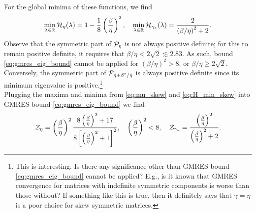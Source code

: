 \documentclass[a4paper,10pt]{article}
\begin{document}
{\begin{itemize}
For the global minima of these functions, we find
\begin{align}
\label{eq:H_min_skew}
\underset{\lambda \in \mathbb{R}}{\min} \,  {\cal H}_{\eta}(\lambda) = 1 - \frac{1}{8} \left( \frac{\beta}{\eta} \right)^2, 
\quad
\underset{\lambda \in \mathbb{R}}{\min} \,  {\cal H}_{\gamma_*}(\lambda) =  \frac{2}{\left( \beta/\eta \right)^2 + 2}. 
\end{align}
Observe that the symmetric part of ${\cal P}_{\eta}$ is not always positive definite; for this to remain positive definite, it requires that $\beta / \eta < 2 \sqrt{2} \lesssim 2.83$. As such, bound \eqref{eq:gmres_eig_bound} cannot be applied for $(\beta / \eta)^2 > 8$, or $\beta / \eta \geq 2 \sqrt{2}$. Conversely, the symmetric part of ${\cal P}_{\eta + \beta^2/\eta}$ is always positive definite since its minimum eigenvalue is positive.\footnote{This is interesting. Is there any significance other than GMRES bound \eqref{eq:gmres_eig_bound} cannot be applied? E.g., is it known that GMRES convergence for matrices with indefinite symmetric components is worse than those without? If something like this is true, then it definitely says that $\gamma = \eta$ is a poor choice for skew symmetric matrices.} \\

Plugging the maxima and minima from \eqref{eq:mu_skew} and \eqref{eq:H_min_skew} into GMRES bound \eqref{eq:gmres_eig_bound} we find
\begin{align}
\label{eq:GMRES_bounds_skew}
{\cal Z}_{\eta} = \left( \frac{\beta}{\eta} \right)^2 \frac{8 \left( \frac{\beta}{\eta} \right)^2 + 17}{ 8 \left[\left( \frac{\beta}{\eta} \right)^2 + 1 \right]^2}, \quad \left( \frac{\beta}{\eta} \right)^2 < 8, 
\quad
{\cal Z}_{\gamma_*} = \frac{ \left( \frac{\beta}{\eta} \right)^2}{\left( \frac{\beta}{\eta} \right)^2 + 2}.
\end{align}


\end{itemize}}
\end{document}
